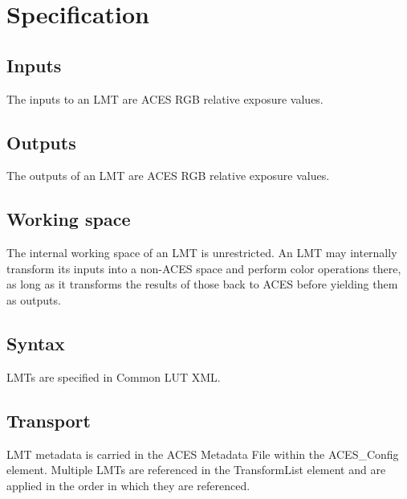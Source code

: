 \regularsectionformat
\chapter{Specification}

\section{Inputs}
The inputs to an LMT are ACES RGB relative exposure values.

\section{Outputs}
The outputs of an LMT are ACES RGB relative exposure values.

\section{Working space}
The internal working space of an LMT is unrestricted. An LMT may internally transform its inputs into a non-ACES space and perform color operations there, as long as it transforms the results of those back to ACES before yielding them as outputs.

\section{Syntax}
LMTs are specified in Common LUT XML.

\section{Transport}
LMT metadata is carried in the ACES Metadata File within the ACES\_Config element. Multiple LMTs are referenced in the TransformList element and are applied in the order in which they are referenced.